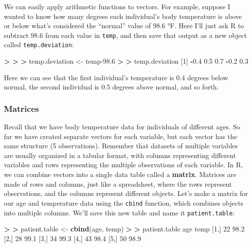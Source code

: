 \documentclass[
]{book}
\newenvironment{Shaded}{\begin{snugshade}}{\end{snugshade}}
\newcommand{\DecValTok}[1]{\textcolor[rgb]{0.00,0.00,0.81}{#1}}
\newcommand{\ErrorTok}[1]{\textcolor[rgb]{0.64,0.00,0.00}{\textbf{#1}}}
\newcommand{\FloatTok}[1]{\textcolor[rgb]{0.00,0.00,0.81}{#1}}
\newcommand{\FunctionTok}[1]{\textcolor[rgb]{0.13,0.29,0.53}{\textbf{#1}}}
\newcommand{\NormalTok}[1]{#1}
\newcommand{\OtherTok}[1]{\textcolor[rgb]{0.56,0.35,0.01}{#1}}
\newcommand{\SpecialCharTok}[1]{\textcolor[rgb]{0.81,0.36,0.00}{\textbf{#1}}}
\begin{document}
We can easily apply arithmetic functions to vectors. For example, suppose I wanted to know how many degrees each individual's body temperature is above or below what's considered the ``normal'' value of 98.6 °F. Here I'll just ask R to subtract 98.6 from each value in \texttt{temp}, and then save that output as a new object called \texttt{temp.deviation}:

\begin{Shaded}
\begin{Highlighting}[]
\SpecialCharTok{\textgreater{}} 
\ErrorTok{\textgreater{}} 
\ErrorTok{\textgreater{}}\NormalTok{ temp.deviation }\OtherTok{\textless{}{-}}\NormalTok{ temp}\FloatTok{{-}98.6}
\SpecialCharTok{\textgreater{}} 
\ErrorTok{\textgreater{}}\NormalTok{ temp.deviation}
\NormalTok{[}\DecValTok{1}\NormalTok{] }\SpecialCharTok{{-}}\FloatTok{0.4}  \FloatTok{0.5}  \FloatTok{0.7} \SpecialCharTok{{-}}\FloatTok{0.2}  \FloatTok{0.3}
\end{Highlighting}
\end{Shaded}

Here we can see that the first individual's temperature is 0.4 degrees below normal, the second individual is 0.5 degrees above normal, and so forth.

\subsubsection{Matrices}\label{matrices}

Recall that we have body temperature data for individuals of different ages. So far we have created separate vectors for each variable, but each vector has the same structure (5 observations). Remember that datasets of multiple variables are usually organized in a tabular format, with columns representing different variables and rows representing the multiple observations of each variable. In R, we can combine vectors into a single data table called a \textbf{matrix}. Matrices are made of rows and columns, just like a spreadsheet, where the rows represent observations, and the columns represent different objects. Let's make a matrix for our age and temperature data using the \texttt{cbind} function, which combines objects into multiple columns. We'll save this new table and name it \texttt{patient.table}:

\begin{Shaded}
\begin{Highlighting}[]
\SpecialCharTok{\textgreater{}} 
\ErrorTok{\textgreater{}}\NormalTok{ patient.table }\OtherTok{\textless{}{-}} \FunctionTok{cbind}\NormalTok{(age, temp)}
\SpecialCharTok{\textgreater{}} 
\ErrorTok{\textgreater{}}\NormalTok{ patient.table}
\NormalTok{     age temp}
\NormalTok{[}\DecValTok{1}\NormalTok{,]  }\DecValTok{22} \FloatTok{98.2}
\NormalTok{[}\DecValTok{2}\NormalTok{,]  }\DecValTok{28} \FloatTok{99.1}
\NormalTok{[}\DecValTok{3}\NormalTok{,]  }\DecValTok{34} \FloatTok{99.3}
\NormalTok{[}\DecValTok{4}\NormalTok{,]  }\DecValTok{43} \FloatTok{98.4}
\NormalTok{[}\DecValTok{5}\NormalTok{,]  }\DecValTok{50} \FloatTok{98.9}
\end{Highlighting}
\end{Shaded}
\end{document}

